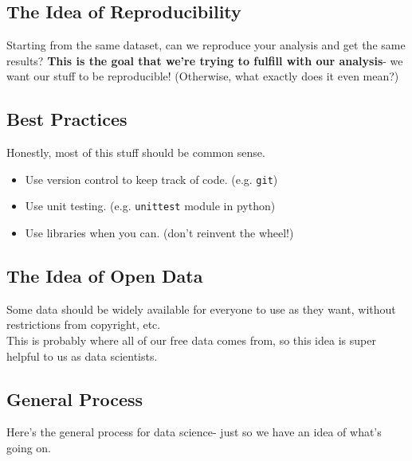 \documentclass[english, 10pt]{article}
\begin{document}
\subsection{The Idea of Reproducibility}

Starting from the same dataset, can we reproduce your analysis and get the same results? \textbf{This is the goal that we're trying to fulfill with our analysis}- we want our stuff to be reproducible! (Otherwise, what exactly does it even mean?)

\subsection{Best Practices}

Honestly, most of this stuff should be common sense.

\begin{itemize}
	\item Use version control to keep track of code. (e.g. \texttt{git})
	\item Use unit testing. (e.g. \texttt{unittest} module in python)
	\item Use libraries when you can. (don't reinvent the wheel!)
\end{itemize}

\subsection{The Idea of Open Data}

Some data should be widely available for everyone to use as they want, without restrictions from copyright, etc.\\

This is probably where all of our free data comes from, so this idea is super helpful to us as data scientists.

\subsection{General Process}

Here's the general process for data science- just so we have an idea of what's going on.\\



\end{document}
